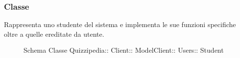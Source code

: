 \subsubsection{Classe }
Rappresenta uno studente del sistema e implementa le sue funzioni specifiche oltre a quelle ereditate da utente.
\begin{figure}[H]
\centering
\noindent{}
\caption[Schema Classe Student]{Schema Classe Quizzipedia:: Client:: ModelClient:: Users:: Student}
\end{figure}
